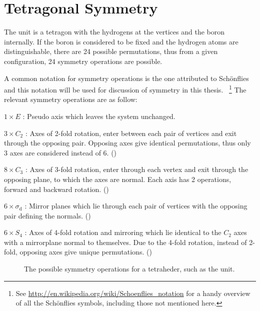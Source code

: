 \section{Tetragonal Symmetry}
\label{sec:symmetry}

The  unit is a tetragon with the hydrogens at the vertices and the boron internally.
If the boron is considered to be fixed and the hydrogen atoms are distinguishable, there are 24 possible permutations, thus from a given configuration, 24 symmetry operations are possible.

A common notation for symmetry operations is the one attributed to Sch\"onflies~\cite{schonflies-notation-1889} and this notation will be used for discussion of symmetry in this thesis.
~\footnote{See \url{http://en.wikipedia.org/wiki/Schoenflies_notation} for a handy overview of all the Sch\"onflies symbols, including those not mentioned here.}
The relevant symmetry operations are as follow:
\bit
\item $1 \times E$ : Pseudo axis which leaves the system unchanged.
\item $3 \times C_2$ : Axes of 2-fold rotation, enter between each pair of vertices and exit through the opposing pair.
Opposing axes give identical permutations, thus only 3 axes are considered instead of 6.
()
\item $8 \times C_3$ : Axes of 3-fold rotation, enter through each vertex and exit through the opposing plane, to which the axes are normal. Each axis has 2 operations, forward and backward rotation.
()
\item $6 \times \sigma_\text{d}$ : Mirror planes which lie through each pair of vertices with the opposing pair defining the normals.
()
\item $6 \times S_4$ : Axes of 4-fold rotation and mirroring which lie identical to the $C_2$ axes with a mirrorplane normal to themselves. Due to the 4-fold rotation, instead of 2-fold, opposing axes give unique permutations.
()
\eit

\begin{figure}[ph]
  \begin{center}
    \parbox{0.85\linewidth}{
      \caption{The possible symmetry operations for a tetraheder, such as the  unit.
      }
      \label{fig:symmetry}
    }
  \end{center}
\end{figure}

